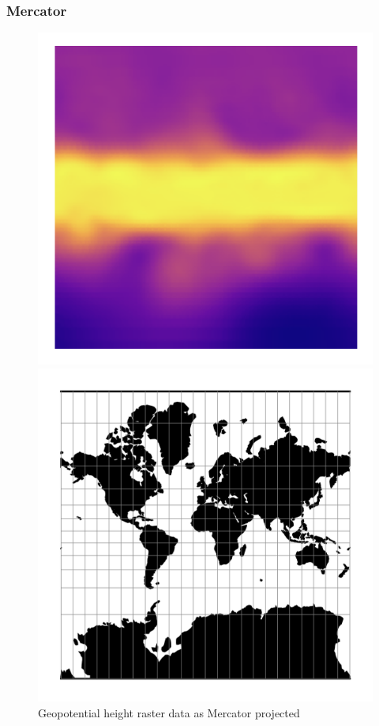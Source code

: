 \subsubsection*{Mercator}
\begin{figure}[h]
    \centering
    \begin{minipage}{0.30\textwidth}
        \centering
        \includegraphics[width=0.9\linewidth]{figures/chapter-8/geopoth_mercator.png}
        \caption{ Geopotential height raster data as Mercator projected}
        \label{fig:merc_geopoth_raster}
    \end{minipage}\hfill
    \begin{minipage}{0.30\textwidth}
        \centering
        \includegraphics[width=0.9\linewidth]{figures/chapter-8/merc.png}

\end{minipage}
\end{figure}
